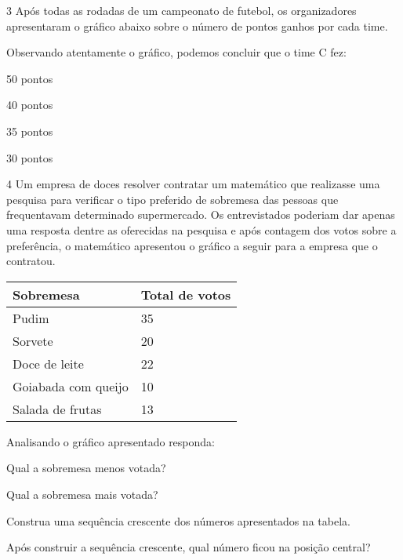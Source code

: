 
\num{3} Após todas as rodadas de um campeonato de futebol, os organizadores
apresentaram o gráfico abaixo sobre o número de pontos ganhos por cada
time.


Observando atentamente o gráfico, podemos concluir que o time C fez:

\begin{escolha}
\item
  50 pontos
\item
  40 pontos
\item
  35 pontos
\item
  30 pontos
\end{escolha}


\num{4} Um empresa de doces resolver contratar um matemático que realizasse
uma pesquisa para verificar o tipo preferido de sobremesa das pessoas
que frequentavam determinado supermercado. Os entrevistados poderiam dar
apenas uma resposta dentre as oferecidas na pesquisa e após contagem dos
votos sobre a preferência, o matemático apresentou o gráfico a seguir
para a empresa que o contratou.


\begin{longtable}[]{@{}ll@{}}
\toprule
Sobremesa & Total de votos\tabularnewline
\midrule
\endhead
Pudim & 35\tabularnewline
Sorvete & 20\tabularnewline
Doce de leite & 22\tabularnewline
Goiabada com queijo & 10\tabularnewline
Salada de frutas & 13\tabularnewline
\bottomrule
\end{longtable}

Analisando o gráfico apresentado responda:

\begin{escolha}
\item
  Qual a sobremesa menos votada?


\item
  Qual a sobremesa mais votada?


\item
  Construa uma sequência crescente dos números apresentados na tabela.


\item
  Após construir a sequência crescente, qual número ficou na posição
  central?

\end{escolha}

